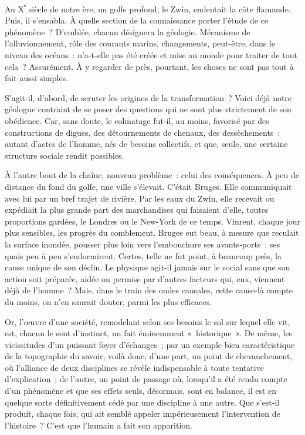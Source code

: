 \documentclass[french,twoside]{book} %
\begin{document}
\noindent Au X\textsuperscript{ᵉ} siècle de notre ère, un golfe profond, le Zwin, endentait la côte flamande. Puis, il s’ensabla. À quelle section de la connaissance porter l’étude de ce phénomène ? D’emblée, chacun désignera la géologie. Méca­nisme de l’alluvionnement, rôle des courants marins, changements, peut-être, dans le niveau des océans : n’a‑t‑elle pas été créée et mise au monde pour traiter de tout cela ? Assurément. À y regarder de près, pourtant, les choses ne sont pas tout à fait aussi simples.\par
S’agit‑il, d’abord, de scruter les origines de la transformation ? Voici déjà notre géologue contraint de se poser des questions qui ne sont plus strictement de son obédience. Car, sans doute, le colmatage fut‑il, au moins, favorisé par des constructions de digues, des détournements de chenaux, des dessèchements : autant d’actes de l’homme, nés de besoins collectifs, et que, seule, une certaine structure sociale rendit possibles.\par
À l’autre bout de la chaîne, nouveau problème : celui des conséquences. À peu de distance du fond du golfe, une ville s’élevait. C’était Bruges. Elle communiquait avec lui par un bref trajet de rivière. Par les eaux du Zwin, elle recevait ou expédiait la plus grande part des marchandises qui faisaient d’elle, toutes proportions gardées, le Londres ou le New-York de ce temps. Vinrent, chaque jour plus sensibles, les progrès du comble­ment. Bruges eut beau, à mesure que reculait la surface inondée, pousser plus loin vers l’embouchure ses avants‑ports : ses quais peu à peu s’endor­mirent. Certes, telle ne fut point, à beaucoup près, la cause unique de son déclin. Le physique agit‑il jamais sur le social sans que son action soit préparée, aidée ou permise par d’autres facteurs qui, eux, viennent déjà de l’homme ? Mais, dans le train des ondes causales, cette cause-là compte du moins, on n’en saurait douter, parmi les plus efficaces.\par
Or, l’œuvre d’une société, remodelant selon ses besoins le sol sur lequel elle vit, est, chacun le sent d’instinct, un fait éminemment « historique ». De même, les vicissitudes d’un puissant foyer d’échanges ; par un exemple bien caractéristique de la topographie du savoir, voilà donc, d’une part, un point de chevauchement, où l’alliance de deux disciplines se révèle indispensable à toute tentative d’explication ; de l’autre, un point de passage où, lorsqu’il a été rendu compte d’un phénomène et que ses effets seuls, désormais, sont en balance, il est en quelque sorte définitivement cédé par une discipline à une autre. Que s’est‑il produit, chaque fois, qui ait semblé appeler impérieusement l’intervention de l’histoire ? C’est que l’humain a fait son apparition.\par
\end{document}
